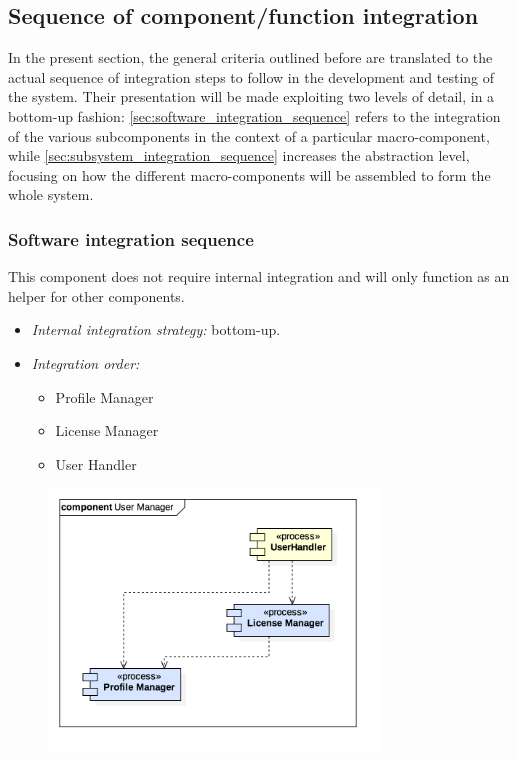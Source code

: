 \subsection{Sequence of component/function integration}
	In the present section, the general criteria outlined before are translated to the actual sequence of integration steps to follow in the development and testing of the system. Their presentation will be made exploiting two levels of detail, in a bottom-up fashion: \autoref{sec:software_integration_sequence} refers to the integration of the various subcomponents in the context of a particular macro-component, while \autoref{sec:subsystem_integration_sequence} increases the abstraction level, focusing on how the different macro-components will be assembled to form the whole system.

	\subsubsection{Software integration sequence}
	\label{sec:software_integration_sequence}
			This component does not require internal integration and will only function as an helper for other components.

			\begin{itemize}[label={},leftmargin=*,noitemsep,topsep=0pt]
				\item \textit{Internal integration strategy:} bottom-up.
				\item \textit{Integration order:}
					\begin{itemize}[noitemsep]
						\item Profile Manager
						\item License Manager
						\item User Handler
					\end{itemize}
			\end{itemize}
			\begin{figure}[h]
				\includegraphics[width=250pt, center]{img/integration_strategy/subcomponents/user_manager.png}
			\end{figure}
		\FloatBarrier

